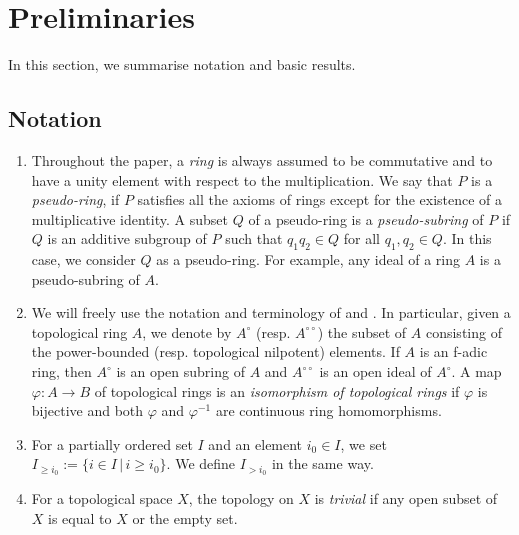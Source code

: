 
\section{Preliminaries}

In this section, we summarise notation and basic results. 



\subsection{Notation}

\begin{enumerate}
\item 
Throughout the paper, a {\em ring} is 
always assumed to be commutative and to have a unity element 
with respect to the multiplication. 
We say that $P$ is a {\em pseudo-ring}, 
if $P$ satisfies all the axioms of rings except for the existence of a multiplicative identity. 
A subset $Q$ of a pseudo-ring is a {\em pseudo-subring} of $P$
if $Q$ is an additive subgroup of $P$ such that 
$q_1q_2 \in Q$ for all $q_1, q_2 \in Q$. 
In this case, we consider $Q$ as a pseudo-ring. 
For example, any ideal of a ring $A$ is a pseudo-subring of $A$. 
\item 
We will freely use the notation and terminology of 
\cite{Hub93} and \cite{Hub94}. 
In particular, given a topological ring $A$, 
we denote by 
$A^{\circ}$ (resp. $A^{\circ\circ}$) the subset of $A$ consisting of 
the power-bounded (resp. topological nilpotent) elements. 
If $A$ is an f-adic ring, then $A^{\circ}$ is an open subring of $A$ 
and $A^{\circ\circ}$ is an open ideal of $A^{\circ}$. 
A map $\varphi:A \to B$ of topological rings 
is an {\em isomorphism of topological rings} 
if $\varphi$ is bijective and both $\varphi$ and $\varphi^{-1}$ 
are continuous ring homomorphisms. 
\item 
For a partially ordered set $I$ and an element $i_0 \in I$, 
we set $I_{\geq i_0}:=\{i \in I\,|\, i\geq i_0\}$. 
We define $I_{>i_0}$ in the same way. 
\item 
For a topological space $X$, 
the topology on $X$ is {\em trivial} 
if any open subset of $X$ is equal to $X$ or the empty set. 
\end{enumerate}





